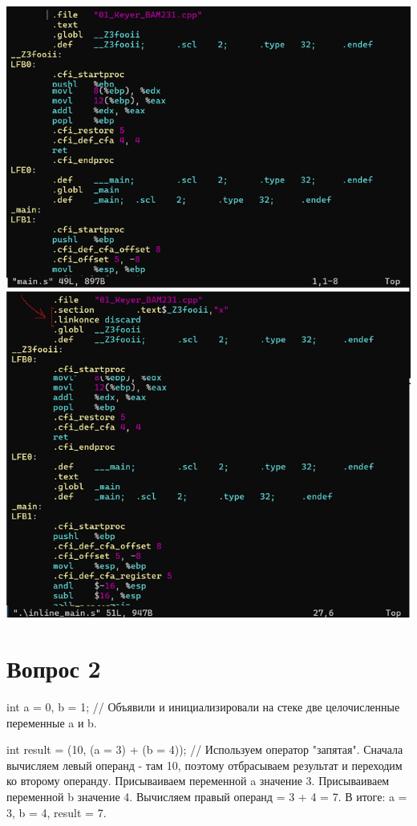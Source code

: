 \documentclass[12pt]{article}
\begin{document}
	\includegraphics[width=\linewidth]{question_1.png}
	
	\section*{Вопрос 2}
	
	int a = 0, b = 1; // Объявили и инициализировали на стеке две целочисленные переменные a и b.
		
	int result = (10, (a = 3) + (b = 4)); // Используем оператор "запятая". Сначала вычисляем левый операнд - там 10, поэтому отбрасываем результат и переходим ко второму операнду. Присываиваем переменной a значение 3. Присываиваем переменной b значение 4. Вычисляем правый операнд = 3 + 4 = 7. В итоге: a = 3, b = 4, result = 7.
	
\end{document}
